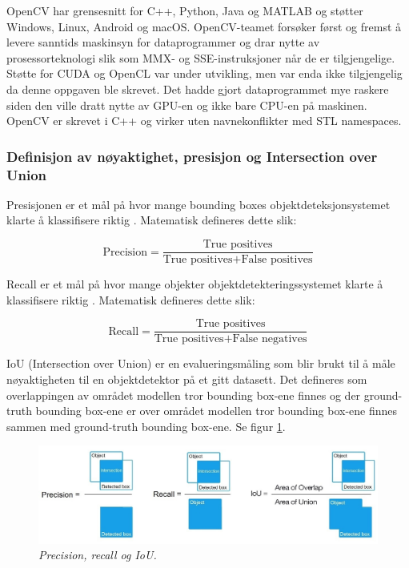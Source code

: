 OpenCV har grensesnitt for C++, Python, Java og MATLAB og støtter Windows, Linux, Android og macOS. OpenCV-teamet forsøker først og fremst å levere sanntids maskinsyn for dataprogrammer og drar nytte av prosessorteknologi slik som MMX- og SSE-instruksjoner når de er tilgjengelige. Støtte for CUDA og OpenCL var under utvikling, men var enda ikke tilgjengelig da denne oppgaven ble skrevet. Det hadde gjort dataprogrammet mye raskere siden den ville dratt nytte av GPU-en og ikke bare CPU-en på maskinen. OpenCV er skrevet i C++ og virker uten navnekonflikter med STL namespaces. \cite{OpenCV Team 2020}

\subsubsection{Definisjon av nøyaktighet, presisjon og Intersection over Union}

Presisjonen er et mål på hvor mange bounding boxes objektdeteksjonsystemet klarte å klassifisere riktig \cite{Siddiqui m.fl. 207 s. 383}. Matematisk defineres dette slik:

\begin{equation}
\text{Precision} = \frac{\text{True positives}}{\text{True positives} + \text{False positives}}
\end{equation}


Recall er et mål på hvor mange objekter objektdetekteringssystemet klarte å klassifisere riktig \cite{Siddiqui m.fl. 207 s. 383}. Matematisk defineres dette slik:

\begin{equation}
\text{Recall} = \frac{\text{True positives}}{\text{True positives} + \text{False negatives}}
\end{equation}

IoU (Intersection over Union) er en evalueringsmåling som blir brukt til å måle nøyaktigheten til en objektdetektor på et gitt datasett. Det defineres som overlappingen av området modellen tror bounding box-ene finnes og der ground-truth bounding box-ene er over området modellen tror bounding box-ene finnes sammen med ground-truth bounding box-ene. Se figur \ref{fig:precision}. \cite{Bochkovskiy 2020}

\begin{figure}[h]
\begin{center} 
\includegraphics[scale=0.45]{figures/precision}
\caption{\small \sl Precision, recall og IoU. \cite{Bochkovskiy 2020} \label{fig:precision}}
\end{center}
\end{figure}

